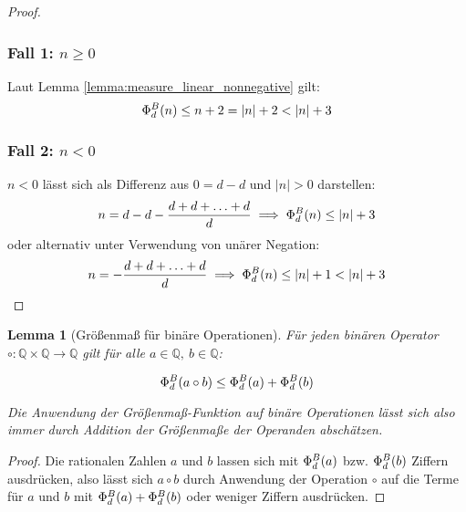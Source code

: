 \documentclass{article}
\newtheorem{lemma}[theorem]{Lemma}
\theoremstyle{nonumberplain}
\newtheorem{proof}{Beweis}
\begin{document}
\begin{proof}
    \subsubsection*{Fall 1: \(n \geq 0\)}

    Laut Lemma \ref{lemma:measure_linear_nonnegative} gilt:
    \[\Phi_{d}^{B}(n) \leq n + 2 = |n| + 2 < |n| + 3\]

    \subsubsection*{Fall 2: \(n < 0\)}
        
    \(n < 0\) lässt sich als Differenz aus \(0 = d-d\) und \(|n| > 0\) darstellen:
    \[n = d - d - \frac{d+d+\ldots+d}{d} \implies \Phi_{d}^{B}(n) \leq |n| + 3\]
    oder alternativ unter Verwendung von unärer Negation:
    \[n = -\frac{d+d+\ldots+d}{d} \implies \Phi_{d}^{B}(n) \leq |n| + 1 < |n| + 3\]
\end{proof}

\begin{lemma}[Größenmaß für binäre Operationen]\label{lemma:phi_binary}
    Für jeden binären Operator \(\circ : \mathbb{Q} \times \mathbb{Q} \to \mathbb{Q}\) gilt für alle \(a\in\mathbb{Q},\ b\in\mathbb{Q}\):

    \[\Phi_{d}^{B}(a \circ b) \leq \Phi_{d}^{B}(a) + \Phi_{d}^{B}(b)\]

    Die Anwendung der Größenmaß-Funktion auf binäre Operationen lässt sich also immer durch Addition der Größenmaße der Operanden abschätzen.
\end{lemma}
\begin{proof}
    Die rationalen Zahlen \(a\) und \(b\) lassen sich mit \(\Phi_{d}^{B}(a)\) bzw. \(\Phi_{d}^{B}(b)\) Ziffern ausdrücken, also lässt sich \(a \circ b\) durch Anwendung der Operation \(\circ\) auf die Terme für \(a\) und \(b\) mit \(\Phi_{d}^{B}(a) + \Phi_{d}^{B}(b)\) oder weniger Ziffern ausdrücken.
\end{proof}
\end{document}
